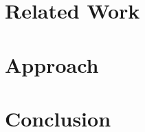 \documentclass[10pt,twocolumn,a4paper]{article}
\begin{document}


\section{Related Work}\label{sec:relwork} 

\section{Approach}

\section{Conclusion}\label{sec:conclusion}



\end{document}

